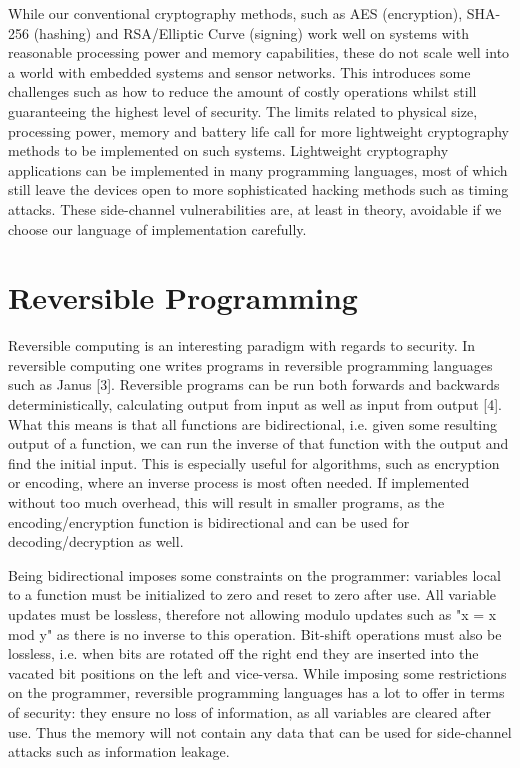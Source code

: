 
While our conventional cryptography methods, such as AES (encryption), SHA-256 (hashing) and RSA/Elliptic Curve (signing) work well on systems with reasonable processing power and memory capabilities, these do not scale well into a world with embedded systems and sensor networks.
This introduces some challenges such as how to reduce the amount of costly operations whilst still guaranteeing the highest level of security. The limits related to physical size, processing power, memory and battery life call for more lightweight cryptography methods to be implemented on such systems.
Lightweight cryptography applications can be implemented in many programming languages, most of which still leave the devices open to more sophisticated hacking methods such as timing attacks. These side-channel vulnerabilities are, at least in theory, avoidable if we choose our language of implementation carefully.

\section{Reversible Programming}
Reversible computing is an interesting paradigm with regards to security. In reversible computing one writes programs in reversible programming languages such as Janus [3].
Reversible programs can be run both forwards and backwards deterministically, calculating output from input as well as input from output [4].
What this means is that all functions are bidirectional, i.e. given some resulting output of a function, we can run the inverse of that function with the output and find the initial input.
This is especially useful for algorithms, such as encryption or encoding, where an inverse process is most often needed.
If implemented without too much overhead, this will result in smaller programs, as the encoding/encryption function is bidirectional and can be used for decoding/decryption as well.

Being bidirectional imposes some constraints on the programmer: variables local to a function must be initialized to zero and reset to zero after use.
All variable updates must be lossless, therefore not allowing modulo updates such as "x = x mod y" as there is no inverse to this operation.
Bit-shift operations must also be lossless, i.e. when bits are rotated off the right end they are inserted into the vacated bit positions on the left and vice-versa. While imposing some restrictions on the programmer, reversible programming languages has a lot to offer in terms of security: they ensure no loss of information, as all variables are cleared after use. Thus the memory will not contain any data that can be used for side-channel attacks such as information leakage.

